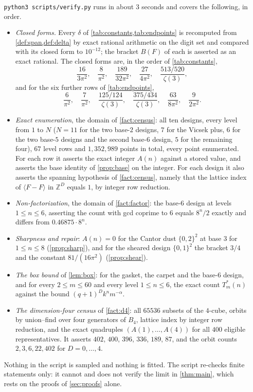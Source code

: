 \documentclass[11pt]{amsart}
\theoremstyle{definition}
\theoremstyle{remark}
\begin{document}
\texttt{python3 scripts/verify.py} runs in about $3$ seconds and covers the following, in order.
\begin{itemize}
\item \emph{Closed forms.} Every $\delta$ of \cref{tab:constants,tab:endpoints} is recomputed from \cref{def:span,def:delta} by exact rational arithmetic on the digit set and compared with its closed form to $10^{-12}$; the bracket $B(F)$ of each is asserted as an exact rational. The closed forms are, in the order of \cref{tab:constants},
\[
  \frac{16}{3\pi^{2}},\quad \frac{8}{\pi^{2}},\quad \frac{189}{32\pi^{2}},\quad \frac{27}{4\pi^{2}},\quad \frac{513/520}{\zeta(3)},
\]
and for the six further rows of \cref{tab:endpoints},
\[
  \frac{6}{\pi^{2}},\quad \frac{7}{\pi^{2}},\quad \frac{125/124}{\zeta(3)},\quad \frac{375/434}{\zeta(3)},\quad \frac{63}{8\pi^{2}},\quad \frac{9}{2\pi^{2}} .
\]
\item \emph{Exact enumeration}, the domain of \cref{fact:census}: all ten designs, every level from $1$ to $N$ ($N=11$ for the two base-$2$ designs, $7$ for the Vicsek plus, $6$ for the two base-$5$ designs and the second base-$6$ design, $5$ for the remaining four), $67$ level rows and $1{,}352{,}989$ points in total, every point enumerated. For each row it asserts the exact integer $A(n)$ against a stored value, and asserts the base identity of \cref{prop:base} on the integer. For each design it also asserts the spanning hypothesis of \cref{fact:census}, namely that the lattice index of $\langle F-F\rangle$ in $\mathbb{Z}^{D}$ equals $1$, by integer row reduction.
\item \emph{Non-factorization}, the domain of \cref{fact:factor}: the base-$6$ design at levels $1 \le n \le 6$, asserting the count with gcd coprime to $6$ equals $8^{n}/2$ exactly and differs from $0.46875\cdot 8^{n}$.
\item \emph{Sharpness and repair}: $A(n)=0$ for the Cantor dust $\{0,2\}^{2}$ at base $3$ for $1 \le n \le 8$ (\cref{prop:sharp}), and for the sheared design $\{0,1\}^{2}$ the bracket $3/4$ and the constant $81/(16\pi^{2})$ (\cref{prop:shear}).
\item \emph{The box bound} of \cref{lem:box}: for the gasket, the carpet and the base-$6$ design, and for every $2 \le m \le 60$ and every level $1 \le n \le 6$, the exact count $T^{*}_m(n)$ against the bound $(q+1)^{D}k^{n}m^{-\alpha}$.
\item \emph{The dimension-four census} of \cref{fact:d4}: all $65536$ subsets of the $4$-cube, orbits by union--find over four generators of $B_4$, lattice index by integer row reduction, and the exact quadruples $(A(1),\dots,A(4))$ for all $400$ eligible representatives. It asserts $402$, $400$, $396$, $336$, $189$, $87$, and the orbit counts $2,3,6,22,402$ for $D=0,\dots,4$.
\end{itemize}
Nothing in the script is sampled and nothing is fitted. The script re-checks finite statements only: it cannot and does not verify the limit in \cref{thm:main}, which rests on the proofs of \cref{sec:proofs} alone.
\end{document}
